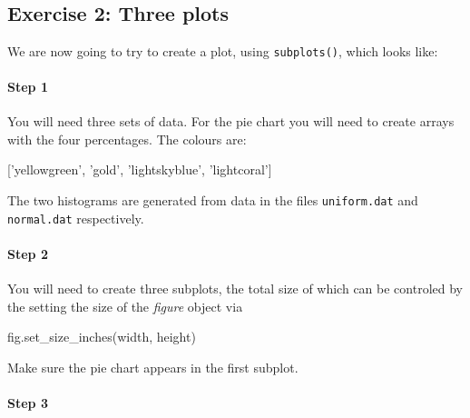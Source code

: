 \documentclass[11pt]{article}
\newenvironment{Shaded}{}{}
\newcommand{\StringTok}[1]{\textcolor[rgb]{0.25,0.44,0.63}{{#1}}}
\newcommand{\NormalTok}[1]{{#1}}
\begin{document}
    \begin{center}
    \end{center}
    { \hspace*{\fill} \\}
    
    \subsection{Exercise 2: Three plots}\label{exercise-2-three-plots}

We are now going to try to create a plot, using \texttt{subplots()},
which looks like:

\paragraph{Step 1}\label{step-1}

You will need three sets of data. For the pie chart you will need to
create arrays with the four percentages. The colours are:

\begin{Shaded}
\begin{Highlighting}[]
\NormalTok{[}\StringTok{'yellowgreen'}\NormalTok{, }\StringTok{'gold'}\NormalTok{, }\StringTok{'lightskyblue'}\NormalTok{, }\StringTok{'lightcoral'}\NormalTok{]}
\end{Highlighting}
\end{Shaded}

The two histograms are generated from data in the files
\texttt{uniform.dat} and \texttt{normal.dat} respectively.

\paragraph{Step 2}\label{step-2}

You will need to create three subplots, the total size of which can be
controled by the setting the size of the \emph{figure} object via

\begin{Shaded}
\begin{Highlighting}[]
\NormalTok{fig.set_size_inches(width, height)}
\end{Highlighting}
\end{Shaded}

Make sure the pie chart appears in the first subplot.

\paragraph{Step 3}\label{step-3}
\end{document}

